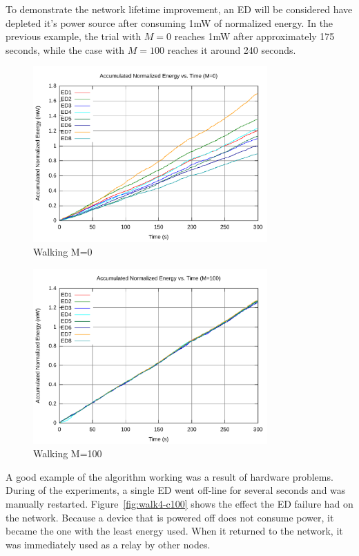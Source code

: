 \documentclass{article}
\begin{document}
To demonstrate the network lifetime improvement, an ED will be considered have depleted it's power source after consuming 1mW of normalized energy. In the previous example, the trial with $M=0$ reaches 1mW after approximately 175 seconds, while the case with $M=100$ reaches it around 240 seconds.

\begin{figure}[!ht]
\includegraphics[width=0.8\textwidth]{figures/walk2-c0.pdf}
\caption{Walking M=0}
\label{fig:walk2-c0}
\end{figure}

\begin{figure}[!ht]
\includegraphics[width=0.8\textwidth]{figures/walk2-c100.pdf}
\caption{Walking M=100}
\label{fig:walk2-c100}
\end{figure}

A good example of the algorithm working was a result of hardware problems. During of the experiments, a single ED went off-line for several seconds and was manually restarted. Figure~\ref{fig:walk4-c100} shows the effect the ED failure had on the network. Because a device that is powered off does not consume power, it became the one with the least energy used. When it returned to the network, it was immediately used as a relay by other nodes.
\end{document}
